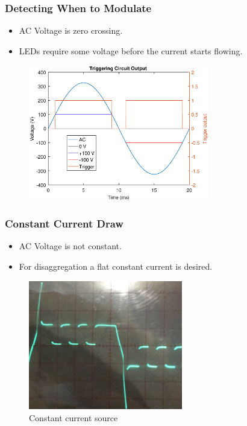 \documentclass{beamer}
\begin{document}
	\begin{frame}\frametitle{Detecting When to Modulate}

		\begin{itemize}

			\item AC Voltage is zero crossing.

			\item LEDs require some voltage before the current starts flowing.

		\end{itemize}
		

		\begin{figure}
			\centering
			\includegraphics[width=0.7\textwidth]{ac-wave-triggering.eps}
		\end{figure}
		
		
	\end{frame}



	\begin{frame}\frametitle{Constant Current Draw}


		\begin{itemize}

			\item AC Voltage is not constant.

			\item For disaggregation a flat constant current is desired.

		\end{itemize}

		\begin{figure}
			\centering
			\includegraphics[width=0.6\textwidth]{../chapters/hardware-chapters/current-source-measurement-cropped.png}
			\caption{Constant current source}
		\end{figure}


	\end{frame}
\end{document}
